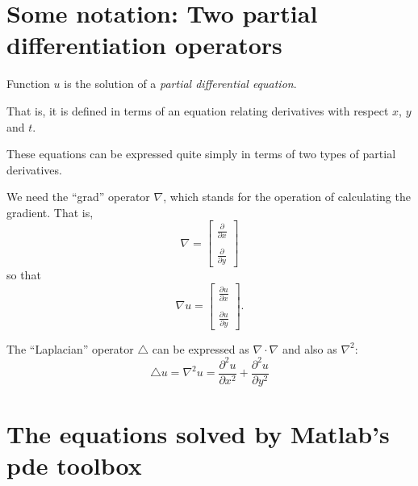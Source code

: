 \documentclass[11pt]{beamer}
\begin{document}
\section{Some notation: Two partial differentiation operators}

\begin{frame}

\bi
  \item Function $u$ is the solution of a \emph{partial differential equation}.
  \item That is, it is defined in terms of an equation relating derivatives
  with respect $x$, $y$ and $t$.
  \item These equations can be expressed quite simply in terms of two types of
  partial derivatives.
\ei

\end{frame}


\begin{frame}

We need the ``grad'' operator $\nabla$, which stands for the
operation of calculating the gradient.  That is,
\[
  \nabla = \left[
  \begin{array}{c}
  \frac{\partial}{\partial x}  \\ \\
  \frac{\partial}{\partial y}
  \end{array}
  \right]
\]
so that
\[
  \nabla u = \left[
  \begin{array}{c}
  \frac{\partial u}{\partial x} \nonumber \\ \\
  \frac{\partial u}{\partial y}
  \end{array}
  \right].
\]

The ``Laplacian'' operator $\triangle$ can be expressed as $\nabla
\cdot \nabla$ and also as $\nabla^2$:
\[
  \triangle u = \nabla^2 u = \frac{\partial^2 u}{\partial x^2}  +
  \frac{\partial^2 u}{\partial y^2}
\]

\end{frame}



\section{The equations solved by Matlab's pde toolbox}
\end{document}
